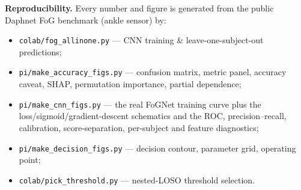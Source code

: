\documentclass[11pt]{article}
\newcommand{\code}[1]{\texttt{\small #1}}
\begin{document}
\vfill
{\color{mute}\footnotesize
\noindent\textbf{Reproducibility.} Every number and figure is generated from the
public Daphnet FoG benchmark (ankle sensor) by:
\begin{itemize}[leftmargin=1.6em,itemsep=1pt]
  \item \code{colab/fog\_allinone.py} --- CNN training \& leave-one-subject-out predictions;
  \item \code{pi/make\_accuracy\_figs.py} --- confusion matrix, metric panel, accuracy caveat, SHAP, permutation importance, partial dependence;
  \item \code{pi/make\_cnn\_figs.py} --- the real FoGNet training curve plus the loss/sigmoid/gradient-descent schematics and the ROC, precision--recall, calibration, score-separation, per-subject and feature diagnostics;
  \item \code{pi/make\_decision\_figs.py} --- decision contour, parameter grid, operating point;
  \item \code{colab/pick\_threshold.py} --- nested-LOSO threshold selection.
\end{itemize}}
\end{document}
